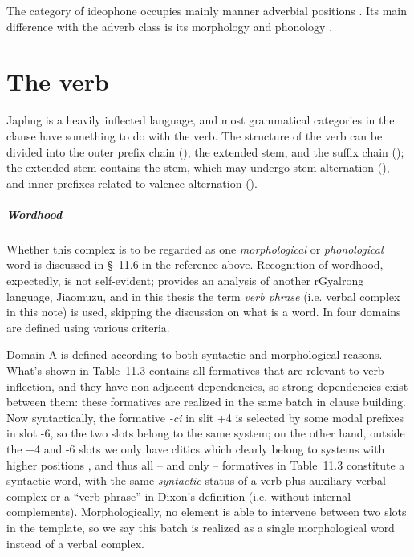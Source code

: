 \documentclass[a4paper, oneside, 12pt]{report}
\newcommand*{\citesec}[1]{\S~{#1}}
\newcommand*{\citechap}[1]{Ch~{#1}}
\newcommand*{\citetable}[1]{Table~{#1}}
\newcommand*{\term}[1]{\emph{#1}}
\newcommand{\form}[1]{\emph{#1}}
\begin{document}
The category of ideophone occupies mainly manner adverbial positions
\citep[\citesec{10.1.7}]{jacques2021grammar}.
Its main difference with the adverb class 
is its morphology \citep[\citesec{10.1.2}]{jacques2021grammar}
and phonology \citep[\citesec{10.1.5}]{jacques2021grammar}.



\chapter{The verb}

Japhug is a heavily inflected language, 
and most grammatical categories in the clause 
have something to do with the verb.
The structure of the verb can be divided into 
the outer prefix chain (\citealt[\citetable{11.1}]{jacques2021grammar}),
the extended stem, 
and the suffix chain (\citealt[\citesec{11.3}]{jacques2021grammar});
the extended stem contains the stem, 
which may undergo stem alternation (\citealt[\citechap{12}]{jacques2021grammar}),
and inner prefixes related to valence alternation
(\citealt[\citesec{11.2.2}]{jacques2021grammar}).

\paragraph*{Wordhood}
Whether this complex is to be regarded as one \emph{morphological} or \emph{phonological} word 
is discussed in \citesec{11.6}
in the reference above.
Recognition of wordhood, expectedly, is not self-evident;
\citet{prins2011web} provides an analysis of another rGyalrong language, Jiaomuzu, 
and in this thesis the term \term{verb phrase} 
(i.e. verbal complex in this note) is used,
skipping the discussion on what is a word.
In \citet[\citetable{11.3}]{jacques2021grammar}
four domains are defined using various criteria.

Domain A is defined according to both syntactic and morphological reasons.
What's shown in 
\citetable{11.3} contains all formatives that are relevant to verb inflection,
and they have non-adjacent dependencies,
so strong dependencies exist between them:
these formatives are realized in the same batch 
in clause building.
Now syntactically, the formative \form{-ci} in slit +4 
is selected by some modal prefixes in slot -6,
so the two slots belong to the same system;
on the other hand, outside the +4 and -6 slots 
we only have clitics which clearly belong to systems with higher positions
\citep[\citesec{11.6.2}]{jacques2021grammar},
and thus all -- and only -- formatives in \citetable{11.3}
constitute a syntactic word,
with the same \emph{syntactic} status of a verb-plus-auxiliary verbal complex or a
``verb phrase'' in Dixon's definition (i.e. without internal complements). 
Morphologically, no element is able to intervene 
between two slots in the template, 
so we say this batch is realized as a single morphological word 
instead of a verbal complex.
\end{document}
